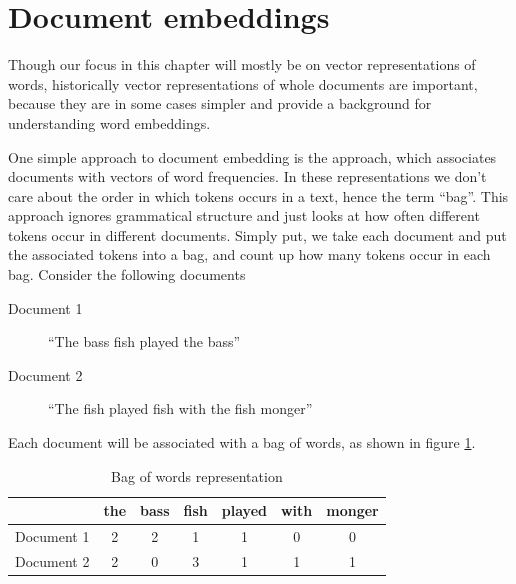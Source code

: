 \section{Document embeddings}

Though our focus in this chapter will mostly be on vector representations of words, historically vector representations of whole documents are important, because they are in some cases simpler and provide a background for understanding word embeddings.

One simple approach to document embedding is the  approach, which associates documents with vectors of word frequencies. In these representations we don't care about the order in which tokens occurs in a text, hence the term ``bag''. This approach ignores grammatical structure and just looks at how often different tokens occur in different documents. Simply put, we take each document and put the associated tokens into a bag, and count up how many tokens occur in each bag. Consider the following documents

\begin{description}
\item[Document 1]  ``The bass fish played the bass''
\item[Document 2]  ``The fish played fish with the fish monger''
\end{description}

Each document will be associated with a bag of words, as shown in figure \ref{exampleBags}.

\begin{table}[h]
    \centering
    \begin{tabular}{|l|c|c|c|c|c|c|}
    \hline
     & the & bass & fish & played & with & monger \\
    \hline
    Document 1 & 2 & 2 & 1 & 1 & 0 & 0 \\
    \hline
    Document 2 & 2 & 0 & 3 & 1 & 1 & 1 \\
    \hline
    \end{tabular}
    \caption{Bag of words representation}
    \label{exampleBags}
\end{table}

